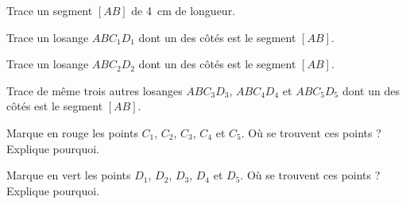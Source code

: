 \begin{myenumerate}
  \item Trace un segment $[AB]$ de 4~cm de longueur.
  \item Trace un losange $ABC_1D_1$ dont un des côtés est le segment $[AB]$.
  \item Trace un losange $ABC_2D_2$ dont un des côtés est le segment $[AB]$.
  \item Trace de même trois autres losanges $ABC_3D_3$, $ABC_4D_4$ et $ABC_5D_5$ dont un des côtés est le segment $[AB]$.
  \item Marque en rouge les points $C_1$, $C_2$, $C_3$, $C_4$ et $C_5$. Où se trouvent ces points ? Explique pourquoi.
  \item Marque en vert les points $D_1$, $D_2$, $D_3$, $D_4$ et $D_5$. Où se trouvent ces points ? Explique pourquoi.
\end{myenumerate}
